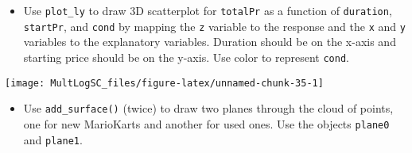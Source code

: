 \documentclass[]{book}
\newenvironment{Shaded}{\begin{snugshade}}{\end{snugshade}}
\newcommand{\KeywordTok}[1]{\textcolor[rgb]{0.13,0.29,0.53}{\textbf{#1}}}
\newcommand{\DataTypeTok}[1]{\textcolor[rgb]{0.13,0.29,0.53}{#1}}
\newcommand{\FloatTok}[1]{\textcolor[rgb]{0.00,0.00,0.81}{#1}}
\newcommand{\StringTok}[1]{\textcolor[rgb]{0.31,0.60,0.02}{#1}}
\newcommand{\CommentTok}[1]{\textcolor[rgb]{0.56,0.35,0.01}{\textit{#1}}}
\newcommand{\OtherTok}[1]{\textcolor[rgb]{0.56,0.35,0.01}{#1}}
\newcommand{\OperatorTok}[1]{\textcolor[rgb]{0.81,0.36,0.00}{\textbf{#1}}}
\newcommand{\NormalTok}[1]{#1}
\providecommand{\tightlist}{%
  \setlength{\itemsep}{0pt}\setlength{\parskip}{0pt}}
\begin{document}
\begin{itemize}
\tightlist
\item
  Use \texttt{plot\_ly} to draw 3D scatterplot for \texttt{totalPr} as a
  function of \texttt{duration}, \texttt{startPr}, and \texttt{cond} by
  mapping the \texttt{z} variable to the response and the \texttt{x} and
  \texttt{y} variables to the explanatory variables. Duration should be
  on the x-axis and starting price should be on the y-axis. Use color to
  represent \texttt{cond}.
\end{itemize}

\begin{Shaded}
\end{Shaded}

\begin{center}\texttt{[image: MultLogSC\_files/figure-latex/unnamed-chunk-35-1]} \end{center}

\begin{itemize}
\tightlist
\item
  Use \texttt{add\_surface()} (twice) to draw two planes through the
  cloud of points, one for new MarioKarts and another for used ones. Use
  the objects \texttt{plane0} and \texttt{plane1}.
\end{itemize}

\begin{Shaded}
\end{Shaded}
\end{document}
